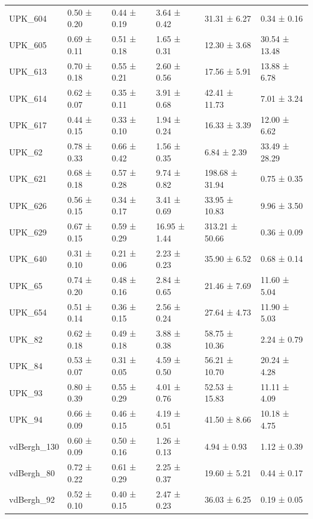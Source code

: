 \begin{tabular}{llllll}
UPK_604 & 0.50 ± 0.20 & 0.44 ± 0.19 & 3.64 ± 0.42 & 31.31 ± 6.27 & 0.34 ± 0.16 \\
UPK_605 & 0.69 ± 0.11 & 0.51 ± 0.18 & 1.65 ± 0.31 & 12.30 ± 3.68 & 30.54 ± 13.48 \\
UPK_613 & 0.70 ± 0.18 & 0.55 ± 0.21 & 2.60 ± 0.56 & 17.56 ± 5.91 & 13.88 ± 6.78 \\
UPK_614 & 0.62 ± 0.07 & 0.35 ± 0.11 & 3.91 ± 0.68 & 42.41 ± 11.73 & 7.01 ± 3.24 \\
UPK_617 & 0.44 ± 0.15 & 0.33 ± 0.10 & 1.94 ± 0.24 & 16.33 ± 3.39 & 12.00 ± 6.62 \\
UPK_62 & 0.78 ± 0.33 & 0.66 ± 0.42 & 1.56 ± 0.35 & 6.84 ± 2.39 & 33.49 ± 28.29 \\
UPK_621 & 0.68 ± 0.18 & 0.57 ± 0.28 & 9.74 ± 0.82 & 198.68 ± 31.94 & 0.75 ± 0.35 \\
UPK_626 & 0.56 ± 0.15 & 0.34 ± 0.17 & 3.41 ± 0.69 & 33.95 ± 10.83 & 9.96 ± 3.50 \\
UPK_629 & 0.67 ± 0.15 & 0.59 ± 0.29 & 16.95 ± 1.44 & 313.21 ± 50.66 & 0.36 ± 0.09 \\
UPK_640 & 0.31 ± 0.10 & 0.21 ± 0.06 & 2.23 ± 0.23 & 35.90 ± 6.52 & 0.68 ± 0.14 \\
UPK_65 & 0.74 ± 0.20 & 0.48 ± 0.16 & 2.84 ± 0.65 & 21.46 ± 7.69 & 11.60 ± 5.04 \\
UPK_654 & 0.51 ± 0.14 & 0.36 ± 0.15 & 2.56 ± 0.24 & 27.64 ± 4.73 & 11.90 ± 5.03 \\
UPK_82 & 0.62 ± 0.18 & 0.49 ± 0.18 & 3.88 ± 0.38 & 58.75 ± 10.36 & 2.24 ± 0.79 \\
UPK_84 & 0.53 ± 0.07 & 0.31 ± 0.05 & 4.59 ± 0.50 & 56.21 ± 10.70 & 20.24 ± 4.28 \\
UPK_93 & 0.80 ± 0.39 & 0.55 ± 0.29 & 4.01 ± 0.76 & 52.53 ± 15.83 & 11.11 ± 4.09 \\
UPK_94 & 0.66 ± 0.09 & 0.46 ± 0.15 & 4.19 ± 0.51 & 41.50 ± 8.66 & 10.18 ± 4.75 \\
vdBergh_130 & 0.60 ± 0.09 & 0.50 ± 0.16 & 1.26 ± 0.13 & 4.94 ± 0.93 & 1.12 ± 0.39 \\
vdBergh_80 & 0.72 ± 0.22 & 0.61 ± 0.29 & 2.25 ± 0.37 & 19.60 ± 5.21 & 0.44 ± 0.17 \\
vdBergh_92 & 0.52 ± 0.10 & 0.40 ± 0.15 & 2.47 ± 0.23 & 36.03 ± 6.25 & 0.19 ± 0.05 \\
\bottomrule
\end{tabular}
